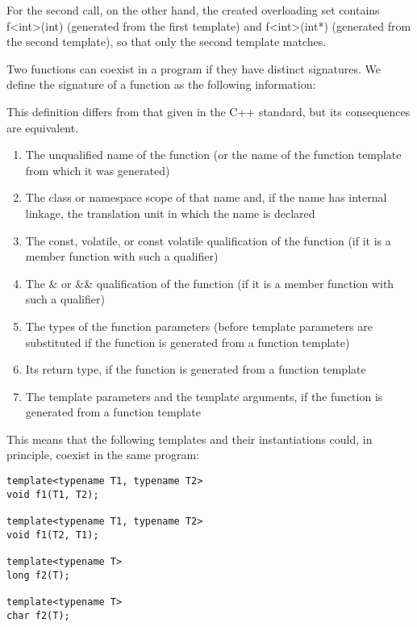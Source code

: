 For the second call, on the other hand, the created overloading set contains f<int>(int) (generated from the first template) and f<int>(int*) (generated from the second template), so that only the second template matches.


Two functions can coexist in a program if they have distinct signatures. We define the signature of a function as the following information:

\begin{tcolorbox}[colback=webgreen!5!white,colframe=webgreen!75!black]
\hspace*{0.75cm}This definition differs from that given in the C++ standard, but its consequences are equivalent.
\end{tcolorbox}

\begin{enumerate}
\item 
The unqualified name of the function (or the name of the function template from which it was 	generated)

\item 
The class or namespace scope of that name and, if the name has internal linkage, the translation unit in which the name is declared

\item 
 The const, volatile, or const volatile qualification of the function (if it is a member function with such a qualifier)

\item 
The \& or \&\& qualification of the function (if it is a member function with such a qualifier)

\item 
The types of the function parameters (before template parameters are substituted if the function is generated from a function template)

\item 
Its return type, if the function is generated from a function template

\item 
The template parameters and the template arguments, if the function is generated from a function template
\end{enumerate}

This means that the following templates and their instantiations could, in principle, coexist in the same program:

\begin{lstlisting}[style=styleCXX]
template<typename T1, typename T2>
void f1(T1, T2);

template<typename T1, typename T2>
void f1(T2, T1);

template<typename T>
long f2(T);

template<typename T>
char f2(T);
\end{lstlisting}

